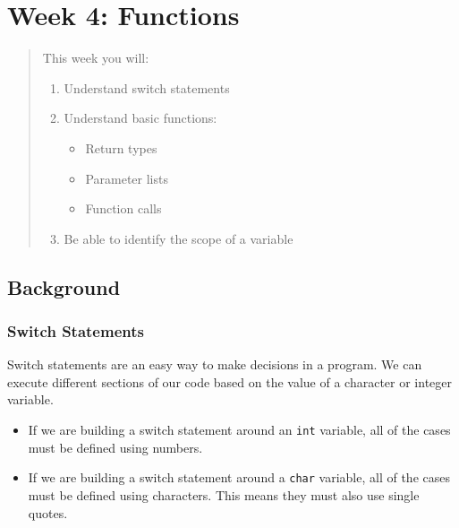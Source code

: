 \chapter*{Week 4: Functions}
\setcounter{chapter}{4}
\setcounter{section}{0}

\begin{abstract}
This week you will:
\begin{enumerate}
    \item Understand switch statements
    \item Understand basic functions:
    \begin{itemize}
        \item Return types
        \item Parameter lists
        \item Function calls
    \end{itemize}
    \item Be able to identify the scope of a variable

\end{enumerate}
    
\end{abstract}

\section{Background}

\subsection{Switch Statements}
Switch statements are an easy way to make decisions in a program. We can execute different sections of our code based on the value of a character or integer variable. 
\begin{itemize}
    \item If we are building a switch statement around an \texttt{int} variable, all of the cases must be defined using numbers. 
    \item If we are building a switch statement around a \texttt{char} variable, all of the cases must be defined using characters. This means they must also use single quotes. 
\end{itemize}

